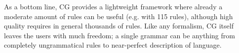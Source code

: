 As a bottom line, CG provides a lightweight framework where already a
moderate amount of rules can be useful (e.g. \cite{lene_trond2011} with 115
rules), although high quality requires in general thousands of rules.
Like any formalism, CG itself leaves the users with much freedom; a
single grammar can be anything from completely ungrammatical rules to near-perfect description of language.






